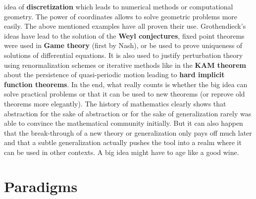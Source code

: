 \documentclass[12pt]{amsart}
\newcounter{example}    \def\example#1{ \item \fontsize{12}{15} \selectfont #1 \fontsize{12}{15} \selectfont }
\begin{document}
idea of {\bf discretization} which leads to numerical methods or computational geometry. 
The power of coordinates allows to solve geometric problems more easily. 
The above mentioned examples have all proven their use. Grothendieck's ideas have lead to the solution of 
the {\bf Weyl conjectures}, fixed point theorems were used in {\bf Game theory} (first by Nash), or be used
to prove uniqueness of solutions of differential equations. It is also used to justify perturbation theory using
renormalization schemes or iterative methods like in the 
{\bf KAM theorem} about the persistence of quasi-periodic motion leading to {\bf hard implicit function theorems}. 
In the end, what really counts is whether the big idea can solve practical problems or that it can be used to new theorems
(or reprove old theorems more elegantly). The history of mathematics clearly shows that abstraction for the sake
of abstraction or for the sake of generalization rarely was able to convince the mathematical community initially.
But it can also happen that the break-through of a new theory or generalization only pays off much later and that a subtle
generalization actually pushes the tool into a realm where it can be used in other contexts. 
A big idea might have to age like a good wine. 

\section*{Paradigms}
\end{document}
